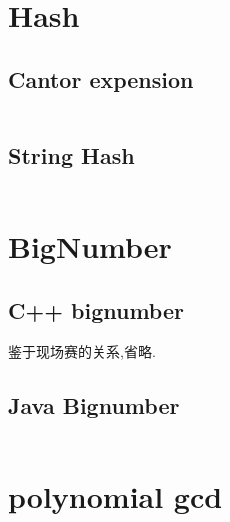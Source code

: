 \documentclass[a4paper,10pt]{article}
\begin{document}
        \section{Hash}
			\subsection{Cantor expension}
				\inputminted[breaklines]{c++}{Other/Cantor-expension.cc}
			\subsection{String Hash}
				\inputminted[breaklines]{c++}{Other/StringHash.cc}
        \newpage
        \section{BigNumber}
            \subsection{C++ bignumber}
                鉴于现场赛的关系,省略.
           
            \subsection{Java Bignumber}
                \inputminted[breaklines]{c++}{Other/bignumber-java.cc}
        
		\newpage
        
        \section{polynomial gcd}
            \inputminted[breaklines]{c++}{Other/polynomial-gcd.cc}
        \newpage
     \ClearShipoutPicture
    
    
\end{document}

